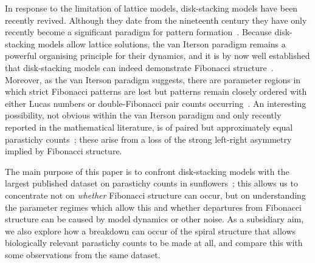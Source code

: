 \documentclass[a4paper,10pt]{amsart}
\begin{document}
In response to the limitation of lattice models, disk-stacking models have been recently revived. Although they date from the nineteenth century they have only recently become a significant paradigm for pattern formation~\cite{godinPhyllotaxisGeometricCanalization2020,goleFibonacciQuasisymmetricPhyllotaxis2016}. Because disk-stacking models allow lattice solutions,  the van Iterson paradigm remains a powerful organising principle for their dynamics, and it is by now well established that disk-stacking models can indeed demonstrate Fibonacci structure~\cite{goleFibonacciQuasisymmetricPhyllotaxis2016}. Moreover, as the van Iterson paradigm suggests, there are parameter regions in which strict Fibonacci patterns are lost but patterns remain closely ordered with either Lucas numbers or double-Fibonacci pair counts occurring~\cite{goleFibonacciQuasisymmetricPhyllotaxis2016,yonekuraMathematicalModelStudies2019}. An interesting possibility, not obvious within the van Iterson paradigm and only recently reported in the mathematical literature, is of paired but approximately equal parastichy counts~\cite{goleFibonacciQuasisymmetricPhyllotaxis2016}; these arise from a loss of the strong left-right asymmetry implied by Fibonacci structure. 

The main purpose of this paper is to confront disk-stacking models with the largest published dataset on parastichy counts in sunflowers~\cite{swintonNovelFibonacciNonFibonacci2016}; this allows us to  concentrate not on \textit{whether} Fibonacci structure can occur, but on understanding the parameter regimes which allow this and whether departures from Fibonacci structure can be caused by model dynamics or other noise. 
As a subsidiary aim, we also explore how a breakdown can occur of the spiral structure that allows biologically relevant parastichy counts to be made at all, and compare this with some observations from the same dataset. 
\end{document}
